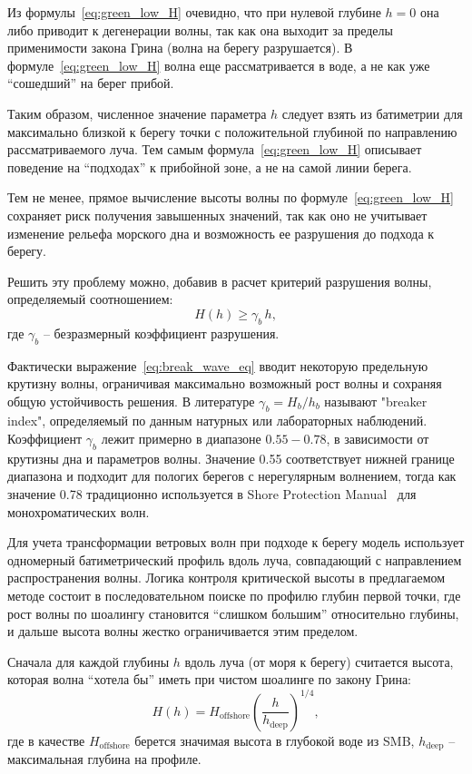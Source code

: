 Из формулы~\eqref{eq:green_low_H} очевидно, что при нулевой глубине $h = 0$ она либо приводит к дегенерации волны, так как она выходит за пределы применимости закона Грина (волна на берегу разрушается).
В формуле~\eqref{eq:green_low_H} волна еще рассматривается в воде, а не как уже \enquote{сошедший} на берег прибой.

Таким образом, численное значение параметра $h$ следует взять из батиметрии для максимально близкой к берегу точки с положительной глубиной по направлению рассматриваемого луча.
Тем самым формула~\eqref{eq:green_low_H} описывает поведение на \enquote{подходах} к прибойной зоне, а не на самой линии берега.

Тем не менее, прямое вычисление высоты волны по формуле~\eqref{eq:green_low_H} сохраняет риск получения завышенных значений, так как оно не учитывает изменение рельефа морского дна и возможность ее разрушения до подхода к берегу.

Решить эту проблему можно, добавив в расчет критерий разрушения волны, определяемый соотношением:
\begin{equation}\label{eq:break_wave_eq}
    H(h) \ge \gamma_b\,h,
\end{equation}
где $\gamma_b$ -- безразмерный коэффициент разрушения.

Фактически выражение~\eqref{eq:break_wave_eq} вводит некоторую предельную крутизну волны, ограничивая максимально возможный рост волны и сохраняя общую устойчивость решения.
В литературе $\gamma_b = H_b/h_b$ называют "breaker index", определяемый по данным натурных или лабораторных наблюдений.
Коэффициент $\gamma_b$ лежит примерно в диапазоне $0.55-0.78$, в зависимости от крутизны дна и параметров волны.
Значение 0.55 соответствует нижней границе диапазона и подходит для пологих берегов с нерегулярным волнением, тогда как значение 0.78 традиционно используется в Shore Protection Manual~\cite{cerc_spm_1984} для монохроматических волн. 

Для учета трансформации ветровых волн при подходе к берегу модель  
использует одномерный батиметрический профиль вдоль луча, совпадающий  
с направлением распространения волны. 
Логика контроля критической высоты в предлагаемом методе состоит в последовательном поиске по профилю глубин первой точки, где рост волны по шоалингу становится \enquote{слишком большим} относительно глубины, и дальше высота волны жестко ограничивается этим пределом.

Сначала для каждой глубины $h$ вдоль луча (от моря к берегу) считается высота, которая волна \enquote{хотела бы} иметь при чистом шоалинге по закону Грина:
\begin{equation}\label{eq:green_low_result}
    H(h) = H_{\text{offshore}} \left(\frac{h}{h_{\text{deep}}}\right)^{1/4},
\end{equation}
где в качестве $H_{\text{offshore}}$ берется значимая высота в глубокой воде из SMB, 
$h_{\text{deep}}$ -- максимальная глубина на профиле. 

